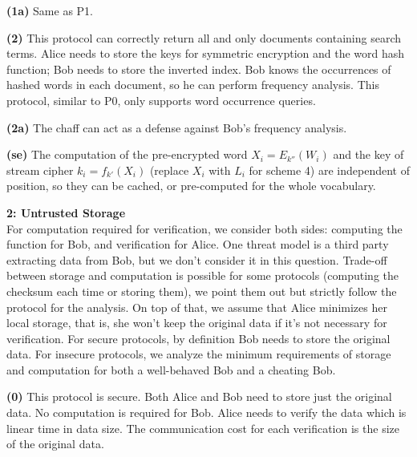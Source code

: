 \documentclass[10pt]{article}
\newcommand\question[2]{\vspace{.1in}\textbf{#1: #2}\vspace{.5em}\vspace{.10in}}
\renewcommand\part[1]{\vspace{.10in}\textbf{(#1)}}
\begin{document}
\part{1a}
Same as P1.

\part{2} 
This protocol can correctly return all and only documents containing search
terms. 
Alice needs to store the keys for symmetric encryption and the word hash
function; Bob needs to store the inverted index. 
Bob knows the occurrences of hashed words in each document, so he can perform
frequency analysis.
This protocol, similar to P0, only supports word occurrence queries.

\part{2a}
The chaff can act as a defense against Bob's frequency analysis.

\part{se}
The computation of the pre-encrypted word $X_i=E_{k''}(W_i)$ and the key of
stream cipher $k_i=f_{k'}(X_i)$ (replace $X_i$ with $L_i$ for scheme 4) are
independent of position, so they can be cached, or pre-computed for the whole
vocabulary.

\newpage
\question{2}{Untrusted Storage}\\
For computation required for verification, we consider both sides: computing the
function for Bob, and verification for Alice.
One threat model is a third party extracting data from Bob, but we don't
consider it in this question.
Trade-off between storage and computation is possible for some protocols
(computing the checksum each time or storing them), we point them out but
strictly follow the protocol for the analysis. On top of that, we assume that
Alice minimizes her local storage, that is, she won't keep the original data if
it's not necessary for verification.
For secure protocols, by definition Bob needs to store the original data.
For insecure protocols, we analyze the minimum requirements of storage and
computation for both a well-behaved Bob and a cheating Bob.

\part{0}
This protocol is secure.
Both Alice and Bob need to store just the original data.
No computation is required for Bob. Alice needs to verify the data
which is linear time in data size. 
The communication cost for each verification is the size of the original data.
\end{document}
